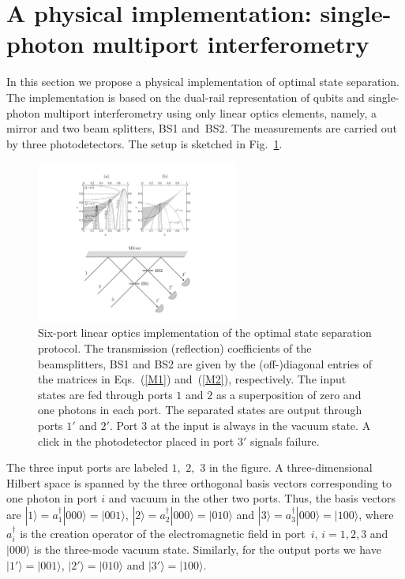 \documentclass[aps,pra,twocolumn,showpacs]{revtex4-1}
\begin{document}
{\section{A physical implementation: single-photon multiport interferometry}\label{implementation}


In this section we propose a physical implementation of optimal state separation. The implementation is based on the dual-rail representation of qubits and single-photon multiport interferometry using only linear optics elements, namely, a mirror and two beam splitters, BS1 and~BS2. The measurements are carried out by three photodetectors. The setup is sketched in Fig.~\ref{fig:5}.

%
\begin{figure}[t] %
   \centering
\includegraphics[width=18em]{Separation_F5}
   \caption{Six-port linear optics implementation of the optimal state separation protocol. The transmission (reflection) coefficients of the beamsplitters, BS1 and BS2 are given by the (off-)diagonal entries of the matrices in Eqs.~(\ref{M1}) and~(\ref{M2}), respectively. The input states are fed through ports $1$ and $2$ as a superposition of zero and one photons in each port. The separated states are output through ports $1'$ and $2'$. Port $3$ at the input is always in the vacuum state. A click in the photodetector placed in port $3'$ signals failure.}
   \label{fig:5}
\end{figure}
%

The three input ports are labeled \mbox{$1$, $2$, $3$} in the figure. A three-dimensional Hilbert space is spanned by the three orthogonal basis vectors corresponding to one photon in port $i$ and vacuum in the other two ports.  Thus, the basis vectors are $|1\rangle=a_1^\dagger|000\rangle=|001\rangle$,  $|2\rangle=a_2^\dagger|000\rangle=|010\rangle$ and $|3\rangle=a_3^\dagger|000\rangle=|100\rangle$, where~$a_i^\dagger$ is the creation operator of the electromagnetic field in port~$i$, $i=1,2,3$ and $|000\rangle$ is the three-mode vacuum state. Similarly, for the output ports we have~$|1'\rangle=|001\rangle$,  $|2'\rangle=|010\rangle$ and $|3'\rangle=|100\rangle$.

}
\end{document}
